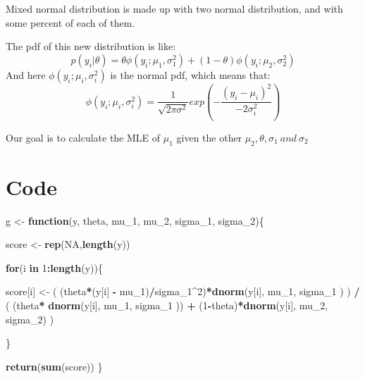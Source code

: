 \documentclass[12pt]{article}
\newenvironment{Shaded}{\begin{snugshade}}{\end{snugshade}}
\newcommand{\ControlFlowTok}[1]{\textcolor[rgb]{0.13,0.29,0.53}{\textbf{#1}}}
\newcommand{\DecValTok}[1]{\textcolor[rgb]{0.00,0.00,0.81}{#1}}
\newcommand{\KeywordTok}[1]{\textcolor[rgb]{0.13,0.29,0.53}{\textbf{#1}}}
\newcommand{\NormalTok}[1]{#1}
\newcommand{\OperatorTok}[1]{\textcolor[rgb]{0.81,0.36,0.00}{\textbf{#1}}}
\newcommand{\OtherTok}[1]{\textcolor[rgb]{0.56,0.35,0.01}{#1}}
\newcommand{\StringTok}[1]{\textcolor[rgb]{0.31,0.60,0.02}{#1}}
\begin{document}
Mixed normal distribution is made up with two normal distribution, and
with some percent of each of them.

The pdf of this new distribution is like:
\[ p(y_i|\theta)=\theta\phi(y_i;\mu_1,\sigma_1^2) + (1-\theta)\phi(y_i;\mu_2,\sigma_2^2)\]
And here \(\phi(y_i;\mu_i,\sigma_i^2)\) is the normal pdf, which means
that:
\[\phi(y_i;\mu_i,\sigma_i^2)=\frac{1}{\sqrt{2\pi\sigma^2}}exp(-\frac{(y_i-\mu_i)^2}{-2\sigma_i^2})\]

Our goal is to calculate the MLE of \(\mu_1\) given the other
\(\mu_2, \theta, \sigma_1 \ and \ \sigma_2\)

\section{Code}

\begin{Shaded}
\begin{Highlighting}[]
\NormalTok{g \textless{}{-}}\StringTok{ }\ControlFlowTok{function}\NormalTok{(y, theta, mu\_}\DecValTok{1}\NormalTok{, mu\_}\DecValTok{2}\NormalTok{, sigma\_}\DecValTok{1}\NormalTok{, sigma\_}\DecValTok{2}\NormalTok{)\{}
  
\NormalTok{  score \textless{}{-}}\StringTok{ }\KeywordTok{rep}\NormalTok{(}\OtherTok{NA}\NormalTok{,}\KeywordTok{length}\NormalTok{(y))}
  
  \ControlFlowTok{for}\NormalTok{(i }\ControlFlowTok{in} \DecValTok{1}\OperatorTok{:}\KeywordTok{length}\NormalTok{(y))\{}
    
\NormalTok{    score[i] \textless{}{-}}\StringTok{ }\NormalTok{( (theta}\OperatorTok{*}\NormalTok{(y[i] }\OperatorTok{{-}}\StringTok{ }\NormalTok{mu\_}\DecValTok{1}\NormalTok{)}\OperatorTok{/}\NormalTok{sigma\_}\DecValTok{1}\OperatorTok{\^{}}\DecValTok{2}\NormalTok{)}\OperatorTok{*}\KeywordTok{dnorm}\NormalTok{(y[i], mu\_}\DecValTok{1}\NormalTok{, sigma\_}\DecValTok{1}\NormalTok{ ) ) }\OperatorTok{/}\StringTok{ }
\StringTok{      }\NormalTok{( (theta}\OperatorTok{*}\StringTok{ }\KeywordTok{dnorm}\NormalTok{(y[i], mu\_}\DecValTok{1}\NormalTok{, sigma\_}\DecValTok{1}\NormalTok{ )) }\OperatorTok{+}\StringTok{ }\NormalTok{(}\DecValTok{1}\OperatorTok{{-}}\NormalTok{theta)}\OperatorTok{*}\KeywordTok{dnorm}\NormalTok{(y[i], mu\_}\DecValTok{2}\NormalTok{, sigma\_}\DecValTok{2}\NormalTok{) )}

\NormalTok{  \}}
  
  \KeywordTok{return}\NormalTok{(}\KeywordTok{sum}\NormalTok{(score))}
\NormalTok{\}}


\end{Highlighting}
\end{Shaded}
\end{document}
